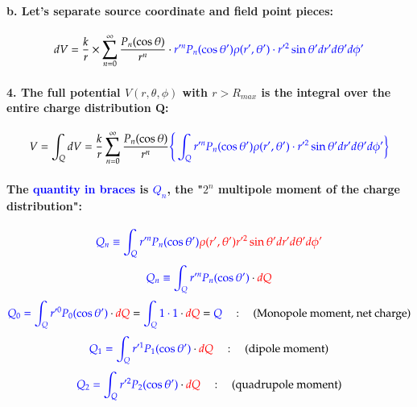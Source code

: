 \documentclass{article}
\begin{document}
\paragraph{\indent b. Let's separate source coordinate and field point pieces:}
\begin{equation*}
    dV=\frac{k}{r}\times\sum_{n=0}^{\infty}\frac{P_n(\cos\theta)}{r^n}\cdot\textcolor{blue}{r'^nP_n(\cos\theta')\rho(r',\theta')\cdot r'^2\sin\theta'dr'd\theta'd\phi'}
\end{equation*}
\paragraph{4. The full potential $V(r,\theta,\phi)$ with $r>R_{max}$ is the integral over the entire charge distribution Q:}
\begin{equation*}
V=\int_QdV=\frac{k}{r}\sum_{n=0}^{\infty}\frac{P_n(\cos\theta)}{r^n} \textcolor{blue}{\Bigg\{ \int_Qr'^nP_n(\cos\theta')\rho(r',\theta')\cdot r'^2\sin\theta'dr'd\theta'd\phi'\bigg\}}
\end{equation*}
\paragraph{The \textcolor{blue}{quantity in braces} is \textcolor{blue}{$Q_n$}, the "$2^n$ multipole moment of the charge distribution":}
\begin{equation*}
    \textcolor{blue}{Q_n\equiv\int_Qr'^nP_n(\cos\theta')}\textcolor{red}{\rho(r',\theta')r'^2\sin\theta'dr'd\theta'd\phi'}
\end{equation*}
\begin{equation*}
    \textcolor{blue}{Q_n\equiv\int_Qr'^nP_n(\cos\theta')}\cdot\textcolor{red}{dQ}
\end{equation*}
\begin{equation*}
    \textcolor{blue}{Q_0=\int_Qr'^0P_0(\cos\theta')}\cdot\textcolor{red}{dQ}=\textcolor{blue}{\int_Q 1\cdot 1}\cdot\textcolor{red}{dQ}=\textcolor{blue}{Q} \quad:\quad \text{(Monopole moment, net charge)}
\end{equation*}
\begin{equation*}
    \textcolor{blue}{Q_1=\int_Qr'^1P_1(\cos\theta')}\cdot\textcolor{red}{dQ}\quad :\quad \text{(dipole moment)}
\end{equation*}
\begin{equation*}
    \textcolor{blue}{Q_2=\int_Qr'^2P_2(\cos\theta')}\cdot\textcolor{red}{dQ}\quad:\quad \text{(quadrupole moment)}
\end{equation*}
\end{document}
